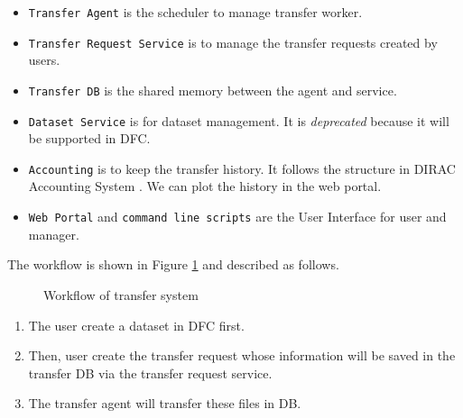 \begin{itemize}
    \item {\tt Transfer Agent} is the scheduler to manage transfer worker.
    \item {\tt Transfer Request Service} is to manage the transfer requests
          created by users.
    \item {\tt Transfer DB} is the shared memory between the agent and 
          service. 
    \item {\tt Dataset Service} is for dataset management. It is 
          {\em deprecated} because it will be supported in DFC.
    \item {\tt Accounting} is to keep the transfer history.
          It follows the structure in DIRAC Accounting System
          \cite{bib:diracacct}.
          We can plot the history in the web portal.
    \item {\tt Web Portal} and {\tt command line scripts} are the 
          User Interface for user and manager.
\end{itemize}

The workflow is shown in Figure \ref{fig:workflow} and described as follows.
\begin{figure}
    
    \caption{Workflow of transfer system} \label{fig:workflow}
\end{figure}

\begin{enumerate}
\item The user create a dataset in DFC first.
\item Then, user create the transfer request
whose information will be saved in the transfer DB via
the transfer request service.
\item The transfer agent will transfer these files in DB.
\end{enumerate}

